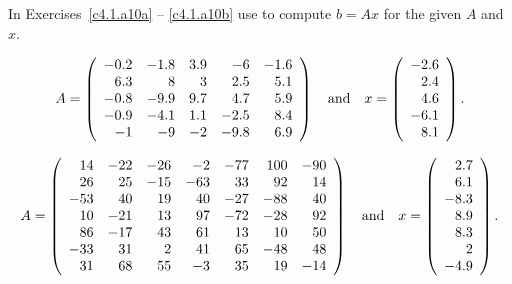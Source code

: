 \noindent In Exercises~\ref{c4.1.a10a} -- \ref{c4.1.a10b} use \Matlab to
compute $b=Ax$ for the given $A$ and $x$.
\begin{exercise} \label{c4.1.a10a}
\begin{equation*}
A=\left(
\begin{array}{rrrrr}
   -0.2 &   -1.8 &    3.9 &    -6 &   -1.6\\
    6.3 &    8   &    3   &    2.5 &    5.1\\
   -0.8 &   -9.9 &    9.7 &    4.7 &    5.9\\
   -0.9 &   -4.1 &    1.1 &   -2.5 &    8.4\\
   -1 &   -9 &   -2 &  -9.8 &    6.9
\end{array}\right)
\quad\mbox{and}\quad
x = \left( \begin{array}{r} -2.6\\  2.4\\  4.6\\   -6.1\\    8.1
\end{array}\right).
\end{equation*}
\end{exercise}
\begin{exercise} \label{c4.1.a10b}
\begin{equation*}
A=\left(
\begin{array}{rrrrrrr}
    14 & -22  &-26 &  -2 & -77 & 100 & -90\\
    26 &  25  &-15 & -63 &  33 &  92 &  14\\
   -53 &  40  & 19 &  40 & -27 & -88 &  40\\
    10 & -21  & 13 &  97 & -72 & -28 &  92\\
    86 & -17  & 43 &  61 &  13 &  10 &  50\\
   -33 &  31  &  2 &  41 &  65 & -48 &  48\\
    31 &  68  & 55 &  -3 &  35 &  19 & -14
\end{array}
\right)\quad\mbox{and}\quad
x = \left( \begin{array}{r} 2.7\\   6.1\\   -8.3\\    8.9\\    8.3\\    2\\
  -4.9
\end{array}\right).
\end{equation*}
\end{exercise}




